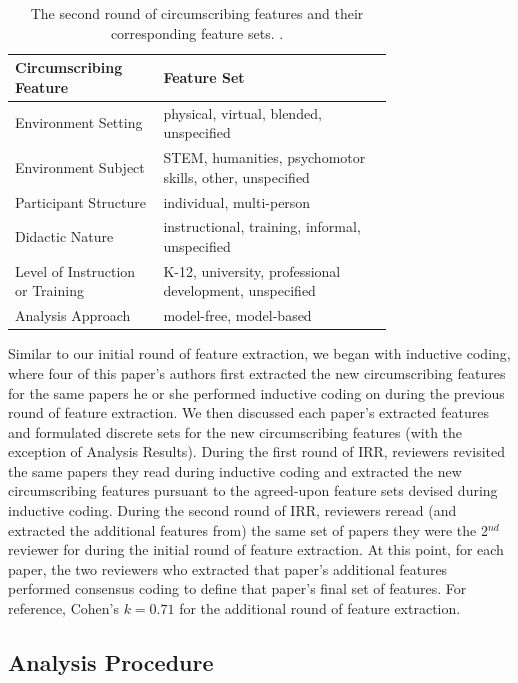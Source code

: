\documentclass[manuscript,screen,review]{acmart}
\begin{document}
\begin{table}[htbp]
    \renewcommand{\arraystretch}{1.3}%
    \centering
    \caption{The second round of circumscribing features and their corresponding feature sets. .}
    \begin{tabular}{p{0.27\linewidth}@{\hskip .1in} | @{\hskip .1in}p{0.48\linewidth}@{\hskip .1in}}
        \toprule
        Circumscribing Feature & Feature Set\\
        \toprule
        Environment Setting & physical, virtual, blended, unspecified\\
        Environment Subject & STEM, humanities, psychomotor skills, other, unspecified\\
        Participant Structure & individual, multi-person\\
        Didactic Nature & instructional, training, informal, unspecified\\
        Level of Instruction or Training & K-12, university, professional development, unspecified\\
        Analysis Approach & model-free, model-based\\
        \bottomrule
    \end{tabular}
    \label{tab:circumscribing_features_2}
\end{table}

Similar to our initial round of feature extraction, we began with inductive coding, where four of this paper's authors first extracted the new circumscribing features for the same papers he or she performed inductive coding on during the previous round of feature extraction. We then discussed each paper's extracted features and formulated discrete sets for the new circumscribing features (with the exception of Analysis Results). During the first round of IRR, reviewers revisited the same papers they read during inductive coding and extracted the new circumscribing features pursuant to the agreed-upon feature sets devised during inductive coding. During the second round of IRR, reviewers reread (and extracted the additional features from) the same set of papers they were the 2$^{nd}$ reviewer for during the initial round of feature extraction. At this point, for each paper, the two reviewers who extracted that paper's additional features performed consensus coding to define that paper's final set of features. For reference, Cohen's $k=0.71$ for the additional round of feature extraction.

\subsection{Analysis Procedure} \label{subsec:analysis_procedure}
\end{document}

